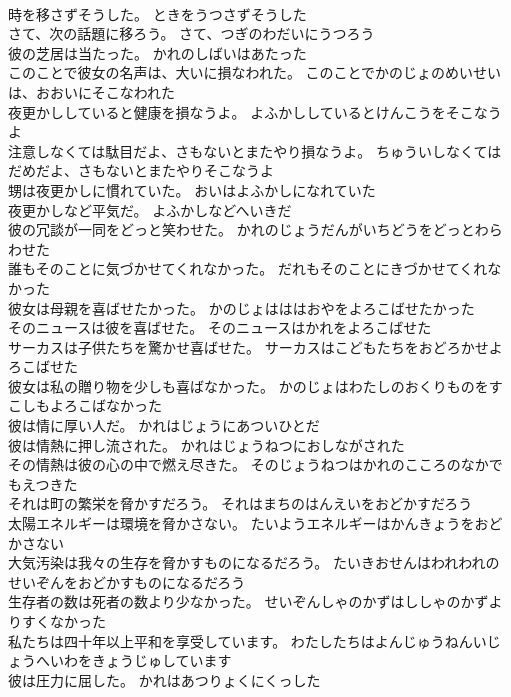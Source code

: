 \documentclass[8pt]{extreport}
\begin{document}
\begin{CJK}{UTF8}{min}
\\	時を移さずそうした。	ときをうつさずそうした 
\\	さて、次の話題に移ろう。	さて、つぎのわだいにうつろう 
\\	彼の芝居は当たった。	かれのしばいはあたった 
\\	このことで彼女の名声は、大いに損なわれた。	このことでかのじょのめいせいは、おおいにそこなわれた 
\\	夜更かししていると健康を損なうよ。	よふかししているとけんこうをそこなうよ 
\\	注意しなくては駄目だよ、さもないとまたやり損なうよ。	ちゅういしなくてはだめだよ、さもないとまたやりそこなうよ 
\\	甥は夜更かしに慣れていた。	おいはよふかしになれていた 
\\	夜更かしなど平気だ。	よふかしなどへいきだ 
\\	彼の冗談が一同をどっと笑わせた。	かれのじょうだんがいちどうをどっとわらわせた 
\\	誰もそのことに気づかせてくれなかった。	だれもそのことにきづかせてくれなかった 
\\	彼女は母親を喜ばせたかった。	かのじょはははおやをよろこばせたかった 
\\	そのニュースは彼を喜ばせた。	そのニュースはかれをよろこばせた 
\\	サーカスは子供たちを驚かせ喜ばせた。	サーカスはこどもたちをおどろかせよろこばせた 
\\	彼女は私の贈り物を少しも喜ばなかった。	かのじょはわたしのおくりものをすこしもよろこばなかった 
\\	彼は情に厚い人だ。	かれはじょうにあついひとだ 
\\	彼は情熱に押し流された。	かれはじょうねつにおしながされた 
\\	その情熱は彼の心の中で燃え尽きた。	そのじょうねつはかれのこころのなかでもえつきた 
\\	それは町の繁栄を脅かすだろう。	それはまちのはんえいをおどかすだろう 
\\	太陽エネルギーは環境を脅かさない。	たいようエネルギーはかんきょうをおどかさない 
\\	大気汚染は我々の生存を脅かすものになるだろう。	たいきおせんはわれわれのせいぞんをおどかすものになるだろう 
\\	生存者の数は死者の数より少なかった。	せいぞんしゃのかずはししゃのかずよりすくなかった 
\\	私たちは四十年以上平和を享受しています。	わたしたちはよんじゅうねんいじょうへいわをきょうじゅしています 
\\	彼は圧力に屈した。	かれはあつりょくにくっした 

\end{CJK}
\end{document}
